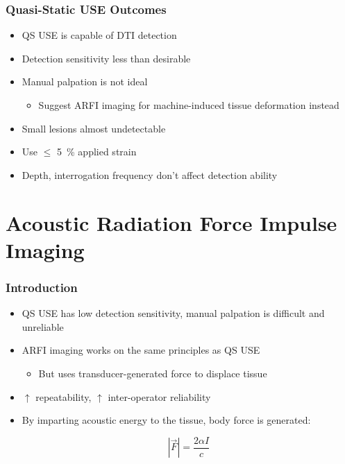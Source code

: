 \documentclass{beamer}
\newcommand{\percent}{\%}
\begin{document}

		\begin{frame}
			\frametitle{Quasi-Static USE Outcomes}
			\begin{itemize}
				\item QS USE \alert{is} capable of DTI detection
				\item Detection sensitivity less than desirable
				\item Manual palpation is not ideal
				\begin{itemize}
					\item Suggest \alert{ARFI imaging} for machine-induced tissue deformation instead
				\end{itemize}
				\item Small lesions almost undetectable
				\item Use $\leq$ \SI{5}{\percent} applied strain
				\item Depth, interrogation frequency don't affect detection ability
			\end{itemize}
		\end{frame}

	\section[ARFI]{Acoustic Radiation Force Impulse Imaging}
		\begin{frame}
			\frametitle{Introduction}
			\begin{itemize}
				\item QS USE has low detection sensitivity, manual palpation is difficult and unreliable
				\item \alert{ARFI} imaging works on the same principles as QS USE
				\begin{itemize}
					\item But uses \alert{transducer-generated} force to displace tissue
				\end{itemize}
				\item $\uparrow$ repeatability, $\uparrow$ inter-operator reliability
				\item By imparting acoustic energy to the tissue, body force is generated:

					\begin{equation*}
						\left|\vec{F}\right| = \frac{2\alpha I}{c}
					\end{equation*}
			\end{itemize}
		\end{frame}
\end{document}
